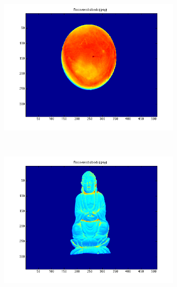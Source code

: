 \documentclass{paper}
\begin{document}
\begin{figure}[h!]
    \centering
    \begin{subfigure}{0.3\textwidth}
        \includegraphics[width=\textwidth]{results/gray/gray_rec_a}
    \end{subfigure}
    ~
    \begin{subfigure}{0.3\textwidth}
        \includegraphics[width=\textwidth]{results/buddha/buddha_rec_a}
    \end{subfigure}
    ~
    \begin{subfigure}{0.3\textwidth}

\end{subfigure}
\end{figure}
\end{document}
